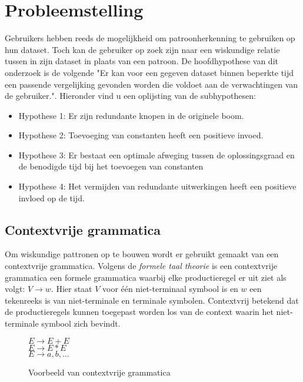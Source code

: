 \documentclass[Main.tex]{subfiles}
\begin{document}
\section{Probleemstelling}
Gebruikers hebben reeds de mogelijkheid om patroonherkenning te gebruiken op hun dataset. Toch kan de gebruiker op zoek zijn naar een wiskundige relatie tussen in zijn dataset in plaats van een patroon. De hoofdhypothese van dit onderzoek is de volgende "Er kan voor een gegeven dataset binnen beperkte tijd een passende vergelijking gevonden worden die voldoet aan de verwachtingen van de gebruiker.". Hieronder vind u een oplijsting van de subhypothesen:

\begin{itemize}
\item Hypothese 1: Er zijn redundante knopen in de originele boom.
\item Hypothese 2: Toevoeging van constanten heeft een positieve invoed.
\item Hypothese 3: Er bestaat een optimale afweging tussen de oplossingsgraad en de benodigde tijd bij het toevoegen van constanten
\item Hypothese 4: Het vermijden van redundante uitwerkingen heeft een positieve invloed op de tijd. 
\end{itemize}

 

\subsection{Contextvrije grammatica}
Om wiskundige pattronen op te bouwen wordt er gebruikt gemaakt van een contextvrije grammatica. Volgens de \textit{formele taal theorie} \cite{cfg}
is een contextvrije grammatica een formele grammatica waarbij elke productieregel er uit ziet als volgt: $V \rightarrow w$. Hier staat $V$  voor \'e\'en niet-terminaal symbool is en $w$ een tekenreeks is van niet-terminale en terminale symbolen. Contextvrij betekend dat de productieregels kunnen toegepast worden los van de context waarin het niet-terminale symbool zich bevindt. \\

\begin{figure}[!htb]
\centering
\begin{framed}
$E \rightarrow E + E$ \\
$E \rightarrow E \ast E$ \\
$E \rightarrow a,b,\dotsc$
\end{framed}
\caption{Voorbeeld van contextvrije grammatica}
\label{fig:cfg}
\end{figure}
\end{document}
